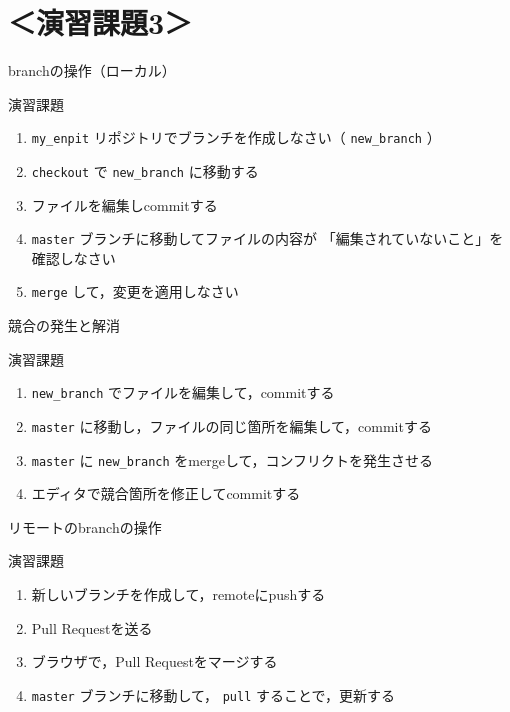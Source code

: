 \documentclass[t, aspectratio=169]{beamer}
\begin{document}
\section{＜演習課題3＞}
\label{sec-3-5}
\begin{frame}[fragile,label=sec-3-5-1]{branchの操作（ローカル）}
 \begin{block}{演習課題}
\begin{enumerate}
\item \texttt{my\_enpit} リポジトリでブランチを作成しなさい（ \texttt{new\_branch} ）
\item \texttt{checkout} で \texttt{new\_branch} に移動する
\item ファイルを編集しcommitする
\item \texttt{master} ブランチに移動してファイルの内容が
「編集されていないこと」を確認しなさい
\item \texttt{merge} して，変更を適用しなさい
\end{enumerate}
\end{block}
\end{frame}

\begin{frame}[fragile,label=sec-3-5-2]{競合の発生と解消}
 \begin{block}{演習課題}
\begin{enumerate}
\item \texttt{new\_branch} でファイルを編集して，commitする
\item \texttt{master} に移動し，ファイルの同じ箇所を編集して，commitする
\item \texttt{master} に \texttt{new\_branch} をmergeして，コンフリクトを発生させる
\item エディタで競合箇所を修正してcommitする
\end{enumerate}
\end{block}
\end{frame}

\begin{frame}[fragile,label=sec-3-5-3]{リモートのbranchの操作}
 \begin{block}{演習課題}
\begin{enumerate}
\item 新しいブランチを作成して，remoteにpushする
\item Pull Requestを送る
\item ブラウザで，Pull Requestをマージする
\item \texttt{master} ブランチに移動して， \texttt{pull} することで，更新する
\end{enumerate}
\end{block}
\end{frame}
\end{document}
